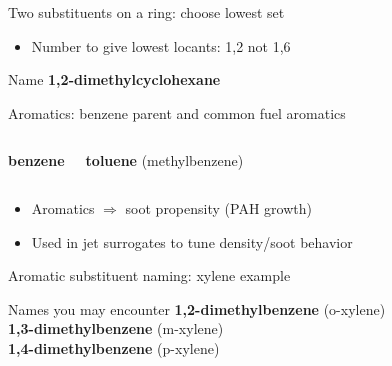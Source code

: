 \documentclass[aspectratio=169]{beamer}
\begin{document}
\begin{frame}{Two substituents on a ring: choose lowest set}
\centering
{}

\vspace{2mm}
\begin{itemize}
\item Number to give lowest locants: 1,2 not 1,6
\end{itemize}

\begin{block}{Name}
\textbf{1,2-dimethylcyclohexane}
\end{block}
\end{frame}

\begin{frame}{Aromatics: benzene parent and common fuel aromatics}
\begin{columns}[T,onlytextwidth]
\centering
{}
\vspace{1mm}

\textbf{benzene}

\centering
{}
\vspace{1mm}

\textbf{toluene} (methylbenzene)
\end{columns}

\begin{itemize}
\item Aromatics \(\Rightarrow\) soot propensity (PAH growth)
\item Used in jet surrogates to tune density/soot behavior
\end{itemize}
\end{frame}

\begin{frame}{Aromatic substituent naming: xylene example}
\centering
{}

\vspace{2mm}
\begin{block}{Names you may encounter}
\textbf{1,2-dimethylbenzene} (o-xylene)\\
\textbf{1,3-dimethylbenzene} (m-xylene)\\
\textbf{1,4-dimethylbenzene} (p-xylene)
\end{block}
\end{frame}
\end{document}
